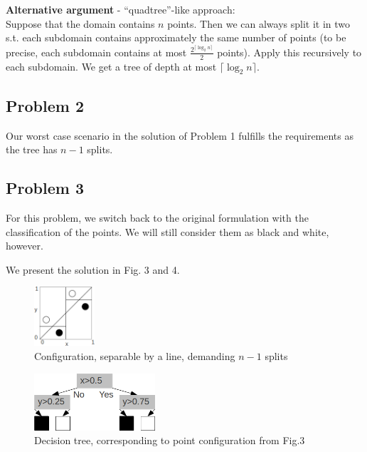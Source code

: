 \textbf{Alternative argument} - ``quadtree''-like approach:\\
Suppose that the domain contains $n$ points. Then we can always split it in two s.t. each subdomain contains approximately the same number of points (to be precise, each subdomain contains at most $\frac{2^{\lceil\log_2n\rceil}}{2}$ points). Apply this recursively to each subdomain. We get a tree of depth at most $\lceil\log_2n\rceil$.

\subsection*{Problem 2}
Our worst case scenario in the solution of Problem 1 fulfills the requirements as the tree has $n-1$ splits.

\newpage
\subsection*{Problem 3}
For this problem, we switch back to the original formulation with the classification of the points. We will still consider them as black and white, however.

We present the solution in Fig. 3 and 4.

\begin{figure}[!h]
  \begin{center}
    \includegraphics[width=0.2\textwidth]{plots/1_3.png}
    \caption{Configuration, separable by a line, demanding $n-1$ splits}
  \end{center}
\end{figure}

\begin{figure}[!h]
  \begin{center}
    \includegraphics[width=0.40\textwidth]{plots/1_3_2.png}
    \caption{Decision tree, corresponding to point configuration from Fig.3}
  \end{center}
\end{figure}
